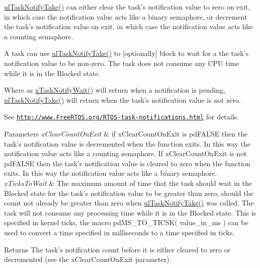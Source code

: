\hyperlink{task_8h_a66540bef602522a01a519f776e4c07d8}{ul\-Task\-Notify\-Take()} can either clear the task's notification value to zero on exit, in which case the notification value acts like a binary semaphore, or decrement the task's notification value on exit, in which case the notification value acts like a counting semaphore.

A task can use \hyperlink{task_8h_a66540bef602522a01a519f776e4c07d8}{ul\-Task\-Notify\-Take()} to \mbox{[}optionally\mbox{]} block to wait for a the task's notification value to be non-\/zero. The task does not consume any C\-P\-U time while it is in the Blocked state.

Where as \hyperlink{task_8h_a0475fcda9718f403521c270a7270ff93}{x\-Task\-Notify\-Wait()} will return when a notification is pending, \hyperlink{task_8h_a66540bef602522a01a519f776e4c07d8}{ul\-Task\-Notify\-Take()} will return when the task's notification value is not zero.

See \href{http://www.FreeRTOS.org/RTOS-task-notifications.html}{\tt http\-://www.\-Free\-R\-T\-O\-S.\-org/\-R\-T\-O\-S-\/task-\/notifications.\-html} for details.


\begin{DoxyParams}{Parameters}
{\em x\-Clear\-Count\-On\-Exit} & if x\-Clear\-Count\-On\-Exit is pd\-F\-A\-L\-S\-E then the task's notification value is decremented when the function exits. In this way the notification value acts like a counting semaphore. If x\-Clear\-Count\-On\-Exit is not pd\-F\-A\-L\-S\-E then the task's notification value is cleared to zero when the function exits. In this way the notification value acts like a binary semaphore.\\
\hline
{\em x\-Ticks\-To\-Wait} & The maximum amount of time that the task should wait in the Blocked state for the task's notification value to be greater than zero, should the count not already be greater than zero when \hyperlink{task_8h_a66540bef602522a01a519f776e4c07d8}{ul\-Task\-Notify\-Take()} was called. The task will not consume any processing time while it is in the Blocked state. This is specified in kernel ticks, the macro pd\-M\-S\-\_\-\-T\-O\-\_\-\-T\-I\-C\-S\-K( value\-\_\-in\-\_\-ms ) can be used to convert a time specified in milliseconds to a time specified in ticks.\\
\hline
\end{DoxyParams}
\begin{DoxyReturn}{Returns}
The task's notification count before it is either cleared to zero or decremented (see the x\-Clear\-Count\-On\-Exit parameter). 
\end{DoxyReturn}
